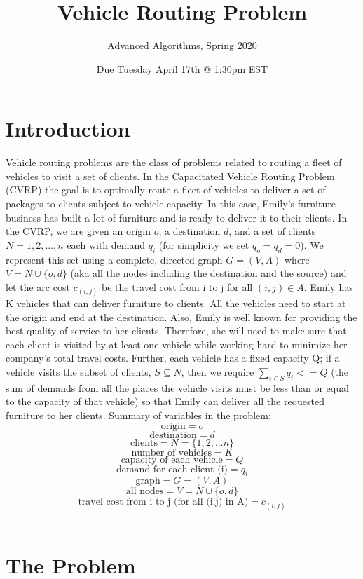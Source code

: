 \documentclass{article}
\title{Vehicle Routing Problem}
\author{Advanced Algorithms, Spring 2020}
\date{Due Tuesday April 17th @ 1:30pm EST}
\begin{document}
\maketitle

\section{Introduction}

Vehicle routing problems are the class of problems related to routing a fleet of vehicles to visit a set of clients. In the Capacitated Vehicle Routing Problem (CVRP) the goal is to optimally route a fleet of vehicles to deliver a set of packages to clients subject to vehicle capacity. In this case, Emily's furniture business has built a lot of furniture and is ready to deliver it to their clients. In the CVRP, we are given an origin $o$, a destination $d$, and a set of clients $N = {1, 2,...,n}$ each with demand $q_i$ (for simplicity we set $q_o = q_d = 0$). We represent this set using a complete, directed graph $G = (V, A)$ where $V = N \cup \{o, d\}$ (aka all the nodes including the destination and the source) and let the arc cost $c_{(i,j)}$ be the travel cost from i to j for all $(i, j) \in A$. Emily has K vehicles that can deliver furniture to clients. All the vehicles need to start at the origin and end at the destination. Also, Emily is well known for providing the best quality of service to her clients. Therefore, she will need to make sure that each client is visited by at least one vehicle while working hard to minimize her company's total travel costs. Further, each vehicle has a fixed capacity Q; if a vehicle visits the subset of clients, $S \subseteq N$, then we require $\sum_{i \in S}{q_i} <= Q$ (the sum of demands from all the places the vehicle visits must be less than or equal to the capacity of that vehicle) so that Emily can deliver all the requested furniture to her clients. 
\bigbreak
Summary of variables in the problem:\\
\[ \mbox{origin} = o \]
\[ \mbox{destination} = d \]
\[ \mbox{clients} = N = \{1,2,...n\} \]
\[ \mbox{number of vehicles} = K \]
\[ \mbox{capacity of each vehicle} = Q \]
\[ \mbox{demand for each client (i)} = q_i \]
\[ \mbox{graph} = G = (V, A) \]
\[ \mbox{all nodes} = V = N \cup \{o, d\} \]
\[ \mbox{travel cost from i to j (for all (i,j) in A)} = c_{(i,j)} \]
\\

\section{The Problem}
\end{document}
